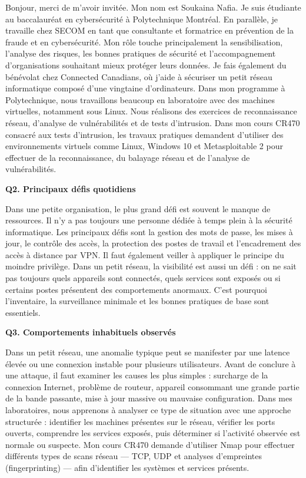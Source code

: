 \documentclass[12pt,a4paper]{article}
\begin{document}
Bonjour, merci de m'avoir invit\'{e}e. Mon nom est Soukaina Nafia. Je suis \'{e}tudiante au
baccalaur\'{e}at en cybers\'{e}curit\'{e} \`{a} Polytechnique Montr\'{e}al. En parall\`{e}le, je travaille chez SECOM
en tant que consultante et formatrice en pr\'{e}vention de la fraude et en cybers\'{e}curit\'{e}. Mon
r\^{o}le touche principalement la sensibilisation, l'analyse des risques, les bonnes pratiques de
s\'{e}curit\'{e} et l'accompagnement d'organisations souhaitant mieux prot\'{e}ger leurs donn\'{e}es. Je
fais \'{e}galement du b\'{e}n\'{e}volat chez Connected Canadians, o\`{u} j'aide \`{a} s\'{e}curiser un petit r\'{e}seau
informatique compos\'{e} d'une vingtaine d'ordinateurs. Dans mon programme \`{a} Polytechnique,
nous travaillons beaucoup en laboratoire avec des machines virtuelles, notamment sous Linux.
Nous r\'{e}alisons des exercices de reconnaissance r\'{e}seau, d'analyse de vuln\'{e}rabilit\'{e}s et de
tests d'intrusion. Dans mon cours CR470 consacr\'{e} aux tests d'intrusion, les travaux pratiques
demandent d'utiliser des environnements virtuels comme Linux, Windows 10 et Metasploitable
2 pour effectuer de la reconnaissance, du balayage r\'{e}seau et de l'analyse de vuln\'{e}rabilit\'{e}s.

\bigskip
\textbf{Q2. Principaux d\'{e}fis quotidiens}

Dans une petite organisation, le plus grand d\'{e}fi est souvent le manque de ressources. Il n'y a
pas toujours une personne d\'{e}di\'{e}e \`{a} temps plein \`{a} la s\'{e}curit\'{e} informatique. Les principaux
d\'{e}fis sont la gestion des mots de passe, les mises \`{a} jour, le contr\^{o}le des acc\`{e}s, la protection
des postes de travail et l'encadrement des acc\`{e}s \`{a} distance par VPN. Il faut \'{e}galement veiller
\`{a} appliquer le principe du moindre privil\`{e}ge. Dans un petit r\'{e}seau, la visibilit\'{e} est aussi un
d\'{e}fi : on ne sait pas toujours quels appareils sont connect\'{e}s, quels services sont expos\'{e}s ou
si certains postes pr\'{e}sentent des comportements anormaux. C'est pourquoi l'inventaire, la
surveillance minimale et les bonnes pratiques de base sont essentiels.

\bigskip
\textbf{Q3. Comportements inhabituels observ\'{e}s}

Dans un petit r\'{e}seau, une anomalie typique peut se manifester par une latence \'{e}lev\'{e}e ou une
connexion instable pour plusieurs utilisateurs. Avant de conclure \`{a} une attaque, il faut examiner
les causes les plus simples : surcharge de la connexion Internet, probl\`{e}me de routeur, appareil
consommant une grande partie de la bande passante, mise \`{a} jour massive ou mauvaise
configuration. Dans mes laboratoires, nous apprenons \`{a} analyser ce type de situation avec une
approche structur\'{e}e : identifier les machines pr\'{e}sentes sur le r\'{e}seau, v\'{e}rifier les ports ouverts,
comprendre les services expos\'{e}s, puis d\'{e}terminer si l'activit\'{e} observ\'{e}e est normale ou
suspecte. Mon cours CR470 demande d'utiliser Nmap pour effectuer diff\'{e}rents types de scans
r\'{e}seau --- TCP, UDP et analyses d'empreintes (fingerprinting) --- afin d'identifier les syst\`{e}mes
et services pr\'{e}sents.
\end{document}
